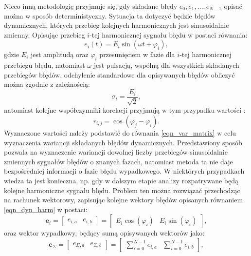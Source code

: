 Nieco inną metodologię przyjmuje się, gdy składane błędy $e_{0}, e_{1}, \hdots, e_{N-1}$ opisać można w sposób deterministyczny. Sytuacja ta dotyczyć będzie błędów dynamicznych, których przebieg kolejnych harmonicznych jest sinusoidalnie zmienny. Opisując przebieg $i$-tej harmonicznej sygnału błędu w postaci równania:
\begin{equation}
e_{i} \left( t \right) = E_{i} \sin \left( \omega t + \varphi_{i} \right) \label{eqn_dyn_harm},
\end{equation}
gdzie $E_{i}$ jest amplitudą oraz $\varphi_{i}$ przesunięciem w fazie dla $i$-tej harmonicznej przebiegu błędu, natomiast $\omega$ jest pulsacją, wspólną dla wszystkich składanych przebiegów błędów, odchylenie standardowe dla opisywanych błędów obliczyć można zgodnie z zależnością:
\begin{equation}
\sigma_{i} = \frac{E_{i}}{\sqrt{2}} \label{eqn_dyn_std},
\end{equation}
natomiast kolejne współczynniki korelacji przyjmują w tym przypadku wartości \cite{jakubiec_system}:
\begin{equation}
r_{i,j} = \cos \left( \varphi_{j} - \varphi_{i} \right) \label{eqn_dyn_corr}.
\end{equation}
Wyznaczone wartości należy podstawić do równania \eqref{eqn_var_matrix} w celu wyznaczenia wariancji składanych błędów dynamicznych. Przedstawiony sposób pozwala na wyznaczenie wariancji dowolnej liczby przebiegów sinusoidalnie zmiennych sygnałów błędów o znanych fazach, natomiast metoda ta nie daje bezpośredniej informacji o fazie błędu wypadkowego. W niektórych przypadkach wiedza ta jest konieczna, np. gdy w dalszym etapie analizy rozpatrywane będą kolejne harmoniczne sygnału błędu. Problem ten można rozwiązać przechodząc na rachunek wektorowy, zapisując kolejne wektory błędów opisanych równaniem \eqref{eqn_dyn_harm} w postaci:
\begin{equation}
\mathbf{e}_{i} =
\begin{bmatrix}
e_{i,a} & e_{i,b}
\end{bmatrix}
=
\begin{bmatrix}
E_{i} \cos \left( \varphi_{i} \right) & E_{i} \sin \left( \varphi_{i} \right)
\end{bmatrix}
\label{eqn_dyn_vect},
\end{equation}
oraz wektor wypadkowy, będący sumą opisywanych wektorów jako:
\begin{equation}
\mathbf{e}_{\Sigma} =
\begin{bmatrix}
e_{\Sigma,a} & e_{\Sigma,b}
\end{bmatrix}
=
\begin{bmatrix}
\sum _{i = 0} ^{N-1} e_{i,a} & \sum _{i = 0} ^{N-1} e_{i,b}
\end{bmatrix}
\label{eqn_dyn_vect_sum},
\end{equation}
